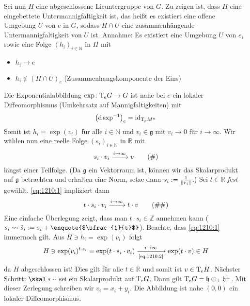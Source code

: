 \begin{beweis}
\begin{enumerate}[1)]
		Sei nun $H$ eine abgeschlossene Lieuntergruppe von $G$.
		Zu zeigen ist, dass $H$ eine eingebettete Untermannigfaltigkeit ist, das heißt es existiert eine offene Umgebung $U$ von $e$ in $G$, sodass $H \cap U$ eine zusammenhängende Untermannigfaltigkeit von $U$ ist. 
		Annahme: Es existiert eine Umgebung $U$ von $e$, sowie eine Folge $(h_i)_{i \in \mathbb{N}}$ in $H$ mit
		\begin{itemize}
			\item $h_i \to e$
			\item $h_i \notin (H \cap U)_e$ (Zusammenhangskomponente der Eins)
		\end{itemize}
		Die Exponentialabbildung $\exp \colon \Tmap_e G \to G$ ist nahe bei $e$ ein lokaler Diffeomorphismus (Umkehrsatz auf Mannigfaltigkeiten) mit 
		\[
			\enbrace*{\mathd \exp^{-1}}_e = \id_{\Tmap_p M^n}
		\]
		Somit ist $h_i = \exp(v_i)$ für alle $i \in \mathbb{N}$ und $v_i \in \mathfrak{g}$ mit $v_i \to 0$ für $i \to \infty$.
		Wir wählen nun eine reelle Folge $(s_i)_{i \in \mathbb{N}}$ in $\mathbb{R}$ mit 
		\begin{equation}
			s_i \cdot v_i \grenzw{i \to \infty} v \label{eq:1210:1} \tag{\#}
		\end{equation}
		längst einer Teilfolge.
		(Da $\mathfrak{g}$ ein Vektorraum ist, können wir das Skalarprodukt auf $\mathfrak{g}$ betrachten und erhalten eine Norm, setze dann $s_i := \frac{1}{\norm*{v_i}} $.)
		Sei $t \in \mathbb{R}$ \emph{fest} gewählt.
		\eqref{eq:1210:1} impliziert dann
		\begin{equation}
			t \cdot s_i \cdot v_i \grenzw{i \to \infty} t \cdot v \label{eq:1210:2} \tag{\#\#}
		\end{equation}
		Eine einfache Überlegung zeigt, dass man $t \cdot s_i \in \mathbb{Z}$ annehmen kann ($s_i \leadsto \tilde{s}_i := s_i + \text{\enquote{$\sfrac{1}{t}$}}$).
		Beachte, dass \eqref{eq:1210:1} immernoch gilt.
		Aus $H \ni h_i = \exp(v_i)$ folgt 
		\[
			H \ni \exp(v_i)^{t \cdot s_i} = \exp \enbrace*{t \cdot s_i \cdot v_i} \xrightarrow[\text{\eqref{eq:1210:2}}]{i \to \infty} \exp(t \cdot v) \in H
		\]
		da $H$ abgeschlossen ist!
		Dies gilt für alle $t \in \mathbb{R}$ und somit ist $v \in \Tmap_e H$.
		Nächster Schritt: $\skal*{\cdot }{\cdot }$ sei ein Skalarprodukt auf $\Tmap_e G$.
		Dann gilt $\Tmap_e G = \mathfrak{h} \oplus_{\bot} \mathfrak{h}^{\bot}$.
		Mit dieser Zerlegung schreiben wir $v_i =x_i + y_i$.
		Die Abbildung 
		ist nahe $(0,0)$ ein lokaler Diffeomorphismus.

\end{enumerate}
\end{beweis}
